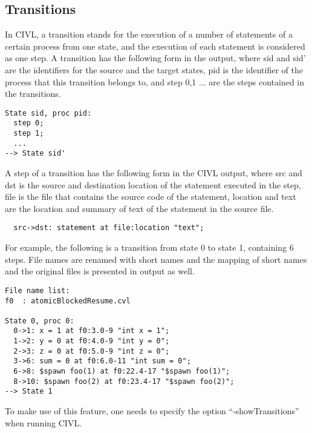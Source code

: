 \documentclass[11pt]{book}
\begin{document}
\subsection{Transitions}
In CIVL, a transition stands for the execution of a number of statements of a certain process from one state, and the execution of each statement is considered as one step. A transition has the following form in the output, where sid and sid' are the identifiers for the source and the target states, pid is the identifier of the process that this transition belongs to, and step 0,1 ... are the steps contained in the transitions.

\begin{verbatim}
State sid, proc pid: 
  step 0;
  step 1;
  ...
--> State sid'
\end{verbatim}

A step of a transition has the following form in the CIVL output, where src and dst is the source and destination location of the statement executed in the step, file is the file that contains the source code of the statement, location and text are the location and summary of text of the statement in the source file.

\begin{verbatim}
  src->dst: statement at file:location "text";
\end{verbatim}

For example, the following is a transition from state 0 to state 1, containing 6 steps. File names are renamed with short names and the mapping of short names and the original files is presented in output as well.

\begin{verbatim}
File name list:
f0	: atomicBlockedResume.cvl

State 0, proc 0: 
  0->1: x = 1 at f0:3.0-9 "int x = 1";
  1->2: y = 0 at f0:4.0-9 "int y = 0";
  2->3: z = 0 at f0:5.0-9 "int z = 0";
  3->6: sum = 0 at f0:6.0-11 "int sum = 0";
  6->8: $spawn foo(1) at f0:22.4-17 "$spawn foo(1)";
  8->10: $spawn foo(2) at f0:23.4-17 "$spawn foo(2)";
--> State 1
\end{verbatim}

To make use of this feature, one needs to specify the option ``-showTransitions'' when running CIVL.



\end{document}
